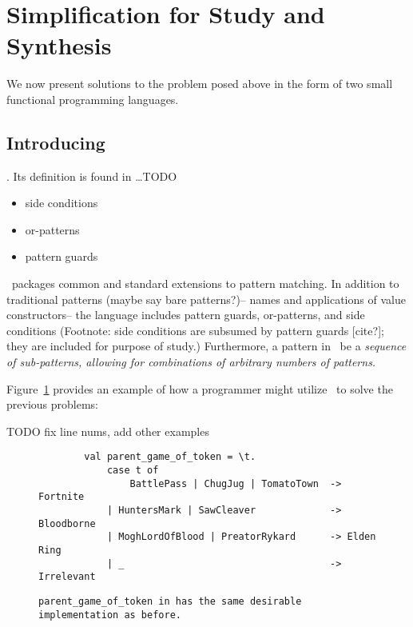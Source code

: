 \documentclass[manuscript,screen,review, 12pt]{acmart}
\begin{document}
    

    

    

    
\section{Simplification for Study and Synthesis}

We now present solutions to the problem posed above in the form of two small
functional programming languages. %

\subsection{Introducing \PPlus\ }


    
    \PPlus. Its definition is found in \dots TODO 
    
    
    \begin{itemize}
        \item side conditions
        \item or-patterns 
        \item pattern guards 
    \end{itemize}

    \PPlus\ packages common and standard extensions to pattern matching. In
    addition to traditional patterns (maybe say bare patterns?)-- names and
    applications of value constructors-- the language includes pattern guards,
    or-patterns, and side conditions (Footnote: side conditions are subsumed by
    pattern guards [cite?]; they are included for purpose of study.)
    Furthermore, a pattern in \PPlus\ be a \it{sequence} of sub-patterns,
    allowing for combinations of arbitrary numbers of patterns. 
    
    

    Figure~\ref{fig:ppexs} provides an example of how a programmer might utilize
    \PPlus\ to solve the previous problems: 

    TODO fix line nums, add other examples 
    \begin{figure}
        \begin{center}
            \pplst 
            \begin{lstlisting}
        val parent_game_of_token = \t. 
            case t of  
                BattlePass | ChugJug | TomatoTown  -> Fortnite
            | HuntersMark | SawCleaver             -> Bloodborne
            | MoghLordOfBlood | PreatorRykard      -> Elden Ring
            | _                                    -> Irrelevant
        \end{lstlisting}
        \end{center}    
        \caption{\tt{parent\_game\_of\_token} in \PPlus has the same desirable
        implementation as before.} 
        \label{fig:ppexs}
        \end{figure}
    
\end{document}
